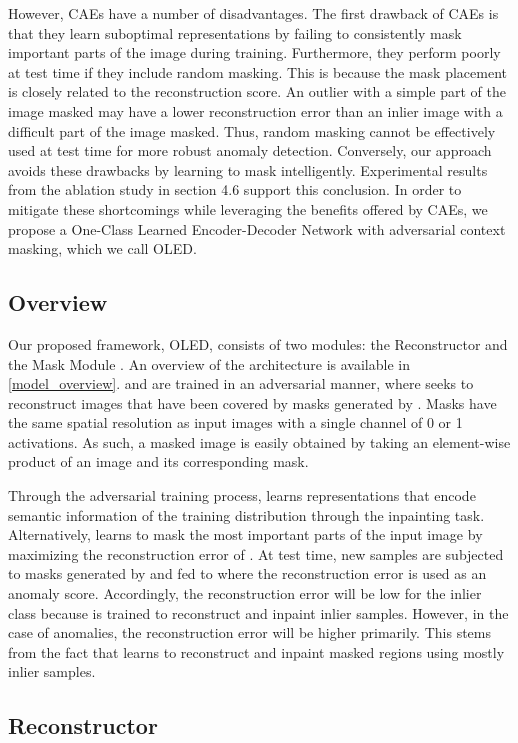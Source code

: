 \documentclass[10pt,twocolumn,letterpaper]{article}
\begin{document}
However, CAEs have a number of disadvantages. The first drawback of CAEs is that they learn suboptimal representations by failing to consistently mask important parts of the image during training. Furthermore, they perform poorly at test time if they include random masking. This is because the mask placement is closely related to the reconstruction score. An outlier with a simple part of the image masked may have a lower reconstruction error than an inlier image with a difficult part of the image masked. Thus, random masking cannot be effectively used at test time for more robust anomaly detection. Conversely, our approach avoids these drawbacks by learning to mask intelligently. Experimental results from the ablation study in section 4.6 support this conclusion.  In order to mitigate these shortcomings while leveraging the benefits offered by CAEs, we propose a One-Class Learned Encoder-Decoder Network with adversarial context masking, which we call OLED.

\subsection{Overview}

 Our proposed framework, OLED, consists of two modules: the Reconstructor  and the Mask Module . An overview of the architecture is available in \ref{model_overview}.  and  are trained in an adversarial manner, where  seeks to reconstruct images that have been covered by masks generated by . Masks have the same spatial resolution as input images with a single channel of 0 or 1 activations. As such, a masked image is easily obtained by taking an element-wise product of an image and its corresponding mask. 
 
 Through the adversarial training process,  learns representations that encode semantic information of the training distribution through the inpainting task. Alternatively,  learns to mask the most important parts of the input image by maximizing the reconstruction error of . At test time, new samples are subjected to masks generated by  and fed to  where the reconstruction error is used as an anomaly score. Accordingly, the reconstruction error will be low for the inlier class because  is trained to reconstruct and inpaint inlier samples. However, in the case of anomalies, the reconstruction error will be higher primarily. This stems from the fact that  learns to reconstruct and inpaint masked regions using mostly inlier samples. 

\subsection{Reconstructor}
\end{document}
